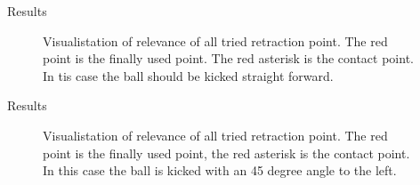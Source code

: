 \documentclass{beamer}
\begin{document}
\begin{frame}{Results}
\begin{figure}[htbp]
  \centering
  \caption{Visualistation of relevance of all tried retraction point. The red
      point is the finally used point. The red asterisk is the contact point. In
      tis case the ball should be kicked straight forward.
         }
  \label{fig:retraction_plot1}
\end{figure}
\end{frame}

\begin{frame}{Results}

\begin{figure}[htbp]
  \centering
  \caption{Visualistation of relevance of all tried retraction point. The red
      point is the finally used point, the red asterisk is the contact point. 
      In this case the ball is kicked with an 45 degree angle to the left.
         }
  \label{fig:retraction_plot2}
\end{figure}
\end{frame}
\end{document}
